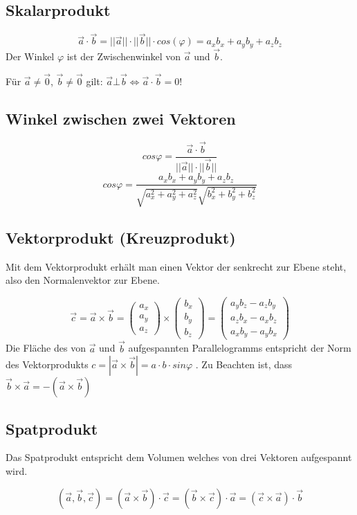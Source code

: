 \subsection{Skalarprodukt}
\[ \boxed{ \vec{a} \cdot \vec{b} = ||\vec{a}|| \cdot ||\vec{b}|| \cdot cos(\varphi) = a_x b_x + a_y b_y + a_z b_z } \]
Der Winkel $\varphi$ ist der Zwischenwinkel von $\vec{a}$ und $\vec{b}$.

\noindent
Für $\vec{a} \neq \vec{0}$, $\vec{b} \neq \vec{0}$ gilt: $\vec{a} \bot \vec{b} \Leftrightarrow \vec{a} \cdot \vec{b} = 0$!

\subsection{Winkel zwischen zwei Vektoren}
\[ \boxed{ cos \varphi = \frac{\vec{a} \cdot \vec{b} }{||\vec{a}|| \cdot ||\vec{b}||} } \]
\[ \boxed{ cos \varphi = \frac{a_x b_x + a_y b_y + a_z b_z}{ \sqrt{a_x^2 + a_y^2 + a_z^2} \sqrt{b_x^2 + b_y^2 + b_z^2} } } \]

\subsection{Vektorprodukt (Kreuzprodukt)}
Mit dem Vektorprodukt erhält man einen Vektor der senkrecht zur Ebene steht, also den Normalenvektor zur Ebene.

\[ \boxed{ \vec{c} = \vec{a} \times \vec{b} = 
\left( 
	  \begin{array}{ccc} 
	    a_x \\ a_y \\ a_z
	  \end{array}
	\right)
	\times
	\left( 
	  \begin{array}{ccc} 
	    b_x \\ b_y \\ b_z
	  \end{array}
	\right)
	=
	\left( 
	  \begin{array}{ccc} 
	    a_y b_z - a_z b_y \\ a_z b_x - a_x b_z \\ a_x b_y - a_y b_x
	  \end{array}
	\right)
} \]
\noindent
Die Fläche des von $\vec{a}$ und $\vec{b}$ aufgespannten Parallelogramms entspricht der Norm des Vektorprodukts $c=|\vec{a}\times\vec{b}| = a \cdot b \cdot sin \varphi$ .
Zu Beachten ist, dass $\vec{b} \times \vec{a} = -(\vec{a} \times \vec{b}) $

\subsection{Spatprodukt}
Das Spatprodukt entspricht dem Volumen welches von drei Vektoren aufgespannt wird.

\[ \boxed{ (\vec{a},\vec{b},\vec{c}) = (\vec{a} \times \vec{b}) \cdot \vec{c} = (\vec{b} \times \vec{c}) \cdot \vec{a} = (\vec{c} \times \vec{a}) \cdot \vec{b} } \]
